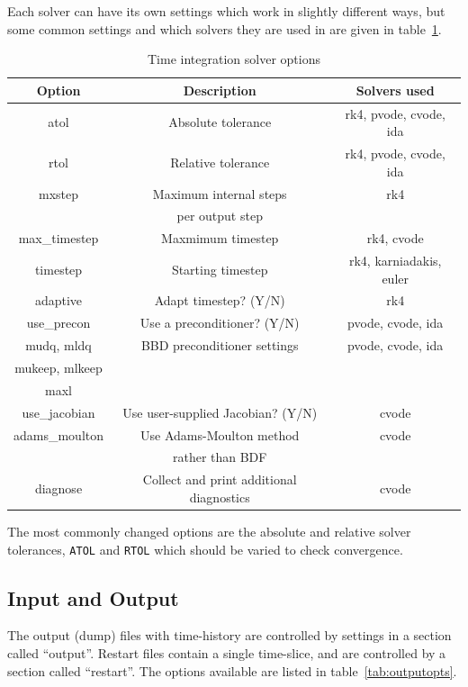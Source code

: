 \documentclass[12pt]{article}
\newcommand{\code}[1]{\texttt{#1}}
\begin{document}
Each solver can have its own settings which work in slightly different ways, but some common
settings and which solvers they are used in are given in table~\ref{tab:solveropts}.
\begin{table}[htb!]
\centering
\caption{Time integration solver options}
\label{tab:solveropts}
\begin{tabular}{c | c | c}
\hline
Option & Description & Solvers used \\
\hline
atol & Absolute tolerance & rk4, pvode, cvode, ida \\
rtol & Relative tolerance & rk4, pvode, cvode, ida \\
mxstep & Maximum internal steps  & rk4 \\
       & per output step & \\
max\_timestep & Maxmimum timestep & rk4, cvode \\
timestep & Starting timestep & rk4, karniadakis, euler \\
adaptive & Adapt timestep? (Y/N) & rk4 \\
use\_precon & Use a preconditioner? (Y/N) & pvode, cvode, ida \\
mudq, mldq & BBD preconditioner settings & pvode, cvode, ida \\
mukeep, mlkeep & & \\
maxl & & \\
use\_jacobian & Use user-supplied Jacobian? (Y/N) & cvode \\
adams\_moulton & Use Adams-Moulton method & cvode \\
 & rather than BDF & \\
diagnose & Collect and print additional diagnostics & cvode \\
\hline
\end{tabular}
\end{table}
The most commonly changed options are the  absolute and relative solver tolerances,
\code{ATOL} and \code{RTOL} which should be varied to check convergence.

\subsection{Input and Output}
\label{sec:iooptions}

The output (dump) files with time-history are controlled by settings in a section called ``output''. 
Restart files contain a single time-slice, and are controlled by a section called ``restart''. The options
available are listed in table~\ref{tab:outputopts}.
\end{document}
